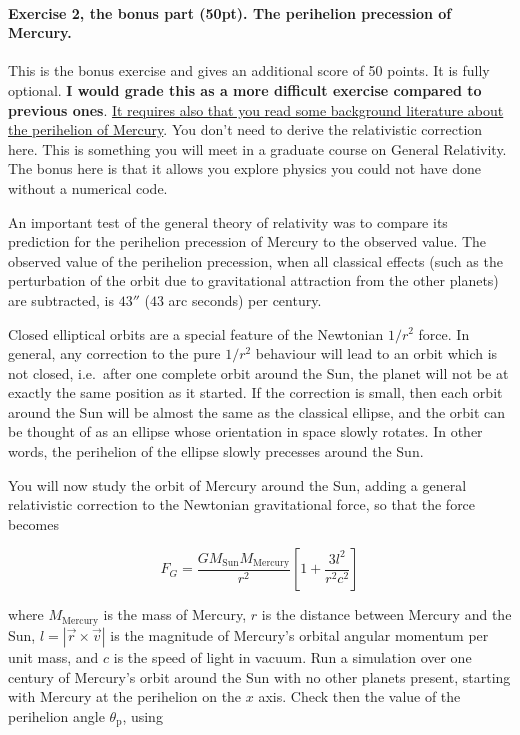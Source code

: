 \documentclass[%
oneside,                 %
final,                   %
10pt]{article}
\begin{document}
\noindent
\paragraph{Exercise 2, the bonus part (50pt).  The perihelion precession of Mercury.}
This is the bonus exercise and gives an additional score of 50
points. It is fully optional. \textbf{I would grade this as a more difficult
exercise compared to previous ones}. \href{{https://en.wikipedia.org/wiki/Tests_of_general_relativity}}{It requires also that you read
some background literature about the perihelion of Mercury}. You don't
need to derive the relativistic correction here. This is something you
will meet in a graduate course on General Relativity. The bonus here
is that it allows you explore physics you could not have done without
a numerical code.

An important test of the general theory of relativity was to compare
its prediction for the perihelion precession of Mercury to the
observed value. The observed value of the perihelion precession, when
all classical effects (such as the perturbation of the orbit due to
gravitational attraction from the other planets) are subtracted, is
$43''$ ($43$ arc seconds) per century.

Closed elliptical orbits are a special feature of the Newtonian
$1/r^2$ force. In general, any correction to the pure $1/r^2$
behaviour will lead to an orbit which is not closed, i.e.~after one
complete orbit around the Sun, the planet will not be at exactly the
same position as it started. If the correction is small, then each
orbit around the Sun will be almost the same as the classical ellipse,
and the orbit can be thought of as an ellipse whose orientation in
space slowly rotates. In other words, the perihelion of the ellipse
slowly precesses around the Sun.

You will now study the orbit of Mercury around the Sun, adding a general relativistic correction to the Newtonian
gravitational force, so that the force becomes

\[
F_G = \frac{GM_\mathrm{Sun}M_\mathrm{Mercury}}{r^2}\left[1 + \frac{3l^2}{r^2c^2}\right]
\]

where $M_\mathrm{Mercury}$ is the mass of Mercury, $r$ is the distance
between Mercury and the Sun, $l=|\vec{r}\times\vec{v}|$ is the
magnitude of Mercury's orbital angular momentum per unit mass, and $c$
is the speed of light in vacuum. Run a simulation over one century of
Mercury's orbit around the Sun with no other planets present, starting
with Mercury at the perihelion on the $x$ axis.  Check then the value
of the perihelion angle $\theta_\mathrm{p}$, using
\end{document}
